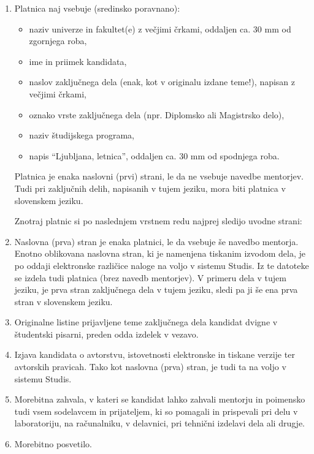 \documentclass[a4paper,twoside,openright,12pt,slovene]{book}
\begin{document}
\begin{enumerate}

\item Platnica naj vsebuje (sredinsko poravnano):
\begin{itemize}[noitemsep]
    \item naziv univerze in fakultet(e) z večjimi črkami, oddaljen ca. 30 mm od zgornjega roba,
    \item ime in priimek kandidata,
    \item naslov zaključnega dela (enak, kot v originalu izdane teme!), napisan z večjimi črkami,
    \item oznako vrste zaključnega dela (npr. Diplomsko ali Magistrsko delo),
    \item naziv študijskega programa,
    \item napis ``Ljubljana, letnica'', oddaljen ca. 30 mm od spodnjega roba.
\end{itemize}
Platnica je enaka naslovni (prvi) strani, le da ne vsebuje navedbe mentorjev. Tudi pri zaključnih delih, napisanih v tujem jeziku, mora biti platnica v slovenskem jeziku.

Znotraj platnic si po naslednjem vrstnem redu najprej sledijo uvodne strani:

\item Naslovna (prva) stran je enaka platnici, le da vsebuje še navedbo mentorja. Enotno oblikovana naslovna stran, ki je namenjena tiskanim izvodom dela, je po oddaji elektronske različice naloge na voljo v sistemu Studis. Iz te datoteke se izdela tudi platnica (brez navedb mentorjev). V primeru dela v tujem jeziku, je prva stran zaključnega dela v tujem jeziku, sledi pa ji še ena prva stran v slovenskem jeziku.

\item Originalne listine prijavljene teme zaključnega dela kandidat dvigne v študentski pisarni, preden odda izdelek v vezavo.

\item Izjava kandidata o avtorstvu, istovetnosti elektronske in tiskane verzije ter avtorskih pravicah. Tako kot naslovna (prva) stran, je tudi ta na voljo v sistemu Studis.

\item Morebitna zahvala, v kateri se kandidat lahko zahvali mentorju in poimensko tudi vsem sodelavcem in prijateljem, ki so pomagali in prispevali pri delu v laboratoriju, na računalniku, v delavnici, pri tehnični izdelavi dela ali drugje.

\item Morebitno posvetilo.


\end{enumerate}
\end{document}
